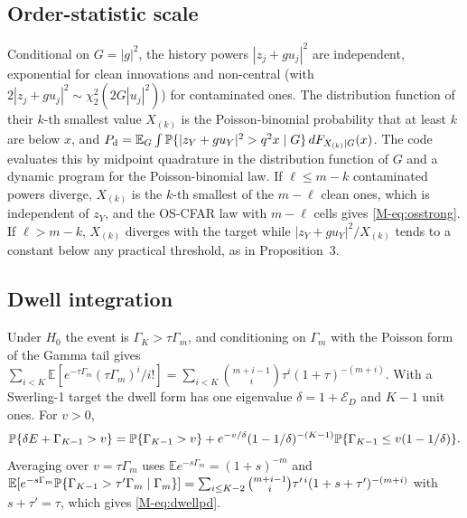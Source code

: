 \subsection{Order-statistic scale}
Conditional on $G=|g|^2$, the history powers $|z_j+gu_j|^2$ are independent, exponential for clean innovations and non-central (with $2|z_j+gu_j|^2\sim\chi^2_2(2G|u_j|^2)$) for contaminated ones. The distribution function of their $k$-th smallest value $X_{(k)}$ is the Poisson-binomial probability that at least $k$ are below $x$, and $P_{\rm d}=\mathbb E_G\int\mathbb{P}\{|z_Y+gu_Y|^2>q^2x\mid G\}\,dF_{X_{(k)}\mid G}(x)$. The code evaluates this by midpoint quadrature in the distribution function of $G$ and a dynamic program for the Poisson-binomial law. If $\ell\le m-k$ contaminated powers diverge, $X_{(k)}$ is the $k$-th smallest of the $m-\ell$ clean ones, which is independent of $z_Y$, and the OS-CFAR law with $m-\ell$ cells gives \eqref{M-eq:osstrong}. If $\ell>m-k$, $X_{(k)}$ diverges with the target while $|z_Y+gu_Y|^2/X_{(k)}$ tends to a constant below any practical threshold, as in Proposition~3.

\subsection{Dwell integration}
Under $H_0$ the event is $\Gamma_K>\tau\Gamma_m$, and conditioning on $\Gamma_m$ with the Poisson form of the Gamma tail gives $\sum_{i<K}\mathbb E[e^{-\tau\Gamma_m}(\tau\Gamma_m)^i/i!]=\sum_{i<K}\binom{m+i-1}{i}\tau^i(1+\tau)^{-(m+i)}$. With a Swerling-1 target the dwell form has one eigenvalue $\delta=1+\mathcal E_D$ and $K-1$ unit ones. For $v>0$,
\[
\mathbb{P}\{\delta E+\Gamma_{K-1}>v\}=\mathbb{P}\{\Gamma_{K-1}>v\}+e^{-v/\delta}(1-1/\delta)^{-(K-1)}\mathbb{P}\{\Gamma_{K-1}\le v(1-1/\delta)\}.
\]
Averaging over $v=\tau\Gamma_m$ uses $\mathbb E e^{-s\Gamma_m}=(1+s)^{-m}$ and $\mathbb E[e^{-s\Gamma_m}\mathbb{P}\{\Gamma_{K-1}>\tau'\Gamma_m\mid\Gamma_m\}]=\sum_{i\le K-2}\binom{m+i-1}{i}\tau'^{\,i}(1+s+\tau')^{-(m+i)}$ with $s+\tau'=\tau$, which gives \eqref{M-eq:dwellpd}.

